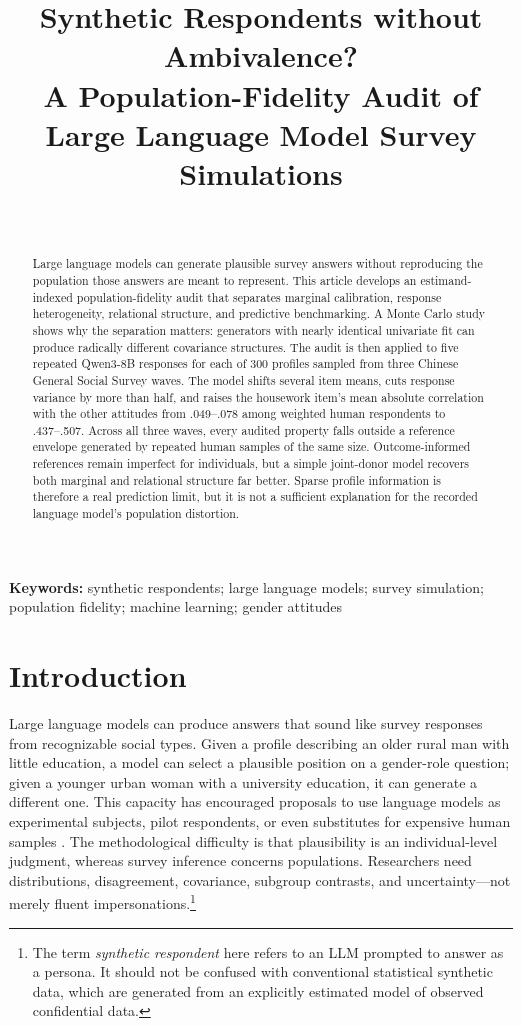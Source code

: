\documentclass[10pt,twocolumn]{article}
\title{\textbf{Synthetic Respondents without Ambivalence?}\\
A Population-Fidelity Audit of Large Language Model Survey Simulations}
\author{\ShowcaseAuthor\\\ShowcaseAffiliation}
\author{}
\date{}
\begin{document}
\maketitle
\ifdefined\SHOWCASE\else
  \thispagestyle{plain}
\fi

\begin{abstract}
Large language models can generate plausible survey answers without reproducing the population those answers are meant to represent. This article develops an estimand-indexed population-fidelity audit that separates marginal calibration, response heterogeneity, relational structure, and predictive benchmarking. A Monte Carlo study shows why the separation matters: generators with nearly identical univariate fit can produce radically different covariance structures. The audit is then applied to five repeated Qwen3-8B responses for each of 300 profiles sampled from three Chinese General Social Survey waves. The model shifts several item means, cuts response variance by more than half, and raises the housework item's mean absolute correlation with the other attitudes from .049--.078 among weighted human respondents to .437--.507. Across all three waves, every audited property falls outside a reference envelope generated by repeated human samples of the same size. Outcome-informed references remain imperfect for individuals, but a simple joint-donor model recovers both marginal and relational structure far better. Sparse profile information is therefore a real prediction limit, but it is not a sufficient explanation for the recorded language model's population distortion.
\end{abstract}

\noindent\textbf{Keywords:} synthetic respondents; large language models; survey simulation; population fidelity; machine learning; gender attitudes

\section{Introduction}

Large language models can produce answers that sound like survey responses from recognizable social
types. Given a profile describing an older rural man with little education, a model can select a
plausible position on a gender-role question; given a younger urban woman with a university
education, it can generate a different one. This capacity has encouraged proposals to use language
models as experimental subjects, pilot respondents, or even substitutes for expensive human samples
\parencite{argyle2023one,aher2023simulate,dillion2023replace}. The methodological difficulty is that
plausibility is an individual-level judgment, whereas survey inference concerns populations.
Researchers need distributions, disagreement, covariance, subgroup contrasts, and uncertainty---not
merely fluent impersonations.\footnote{The term \emph{synthetic respondent} here refers to an LLM
prompted to answer as a persona. It should not be confused with conventional statistical synthetic
data, which are generated from an explicitly estimated model of observed confidential data.}
\end{document}
